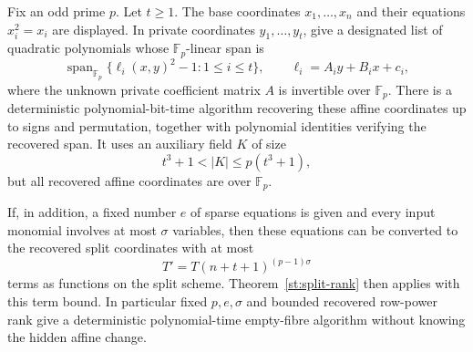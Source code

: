 \begin{theorem}
\label{st:hidden-quadrics}
Fix an odd prime $p$. Let $t\ge1$. The base coordinates $x_1,\ldots,x_n$ and their equations $x_i^2=x_i$ are displayed. In private coordinates $y_1,\ldots,y_t$, give a designated list of quadratic polynomials whose $\mathbb F_p$-linear span is
\[
 \operatorname{span}_{\mathbb F_p}
 \{\ell_i(x,y)^2-1:1\le i\le t\},
 \qquad \ell_i=A_i y+B_i x+c_i,
\]
where the unknown private coefficient matrix $A$ is invertible over $\mathbb F_p$. There is a deterministic polynomial-bit-time algorithm recovering these affine coordinates up to signs and permutation, together with polynomial identities verifying the recovered span. It uses an auxiliary field $K$ of size
\[
 t^3+1<|K|\le p(t^3+1),
\]
but all recovered affine coordinates are over $\mathbb F_p$.

If, in addition, a fixed number $e$ of sparse equations is given and every input monomial involves at most $\sigma$ variables, then these equations can be converted to the recovered split coordinates with at most
\[
 T'=T(n+t+1)^{(p-1)\sigma}
\]
terms as functions on the split scheme. Theorem~\ref{st:split-rank} then applies with this term bound. In particular fixed $p,e,\sigma$ and bounded recovered row-power rank give a deterministic polynomial-time empty-fibre algorithm without knowing the hidden affine change.
\end{theorem}
